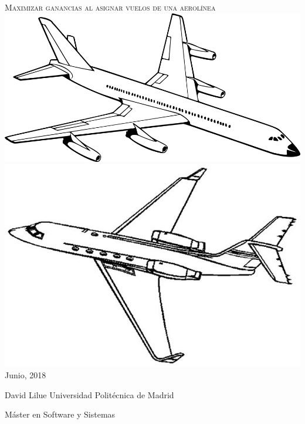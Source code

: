 \documentclass[12pt]{article}
\begin{document}
\begin{center}
    \phantom{x}
    \vfill
    {\Huge \textsc{Maximizar ganancias al asignar vuelos de una aerolínea}}
    \vfill
    \includegraphics[scale=.23]{./assets/aeroplane-2026921_960_720.png}
    \includegraphics[scale=.37]{./assets/learjet-private-jet-coloring-page.jpg}
    \vfill
    Junio, 2018
    
    \vspace{2em}
    
    {\large David Lilue}
    \vfill
    {\Large Universidad Politécnica de Madrid}

    {\Large Máster en Software y Sistemas}
    \vfill
\end{center}


\thispagestyle{empty}

\newpage

\tableofcontents
\listoffigures
\listoftables
\thispagestyle{empty}

\newpage
\end{document}
